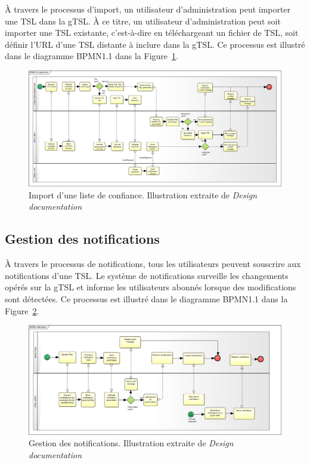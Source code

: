 \documentclass{tnreport}
\begin{document}
À travers le processus d'import, un utilisateur d'administration peut importer une TSL dans la gTSL. À ce titre, un utilisateur d'administration peut soit importer une TSL existante, c'est-à-dire en téléchargeant un fichier de TSL, soit définir l'URL d'une TSL distante à inclure dans la gTSL. Ce processus est illustré dans le diagramme BPMN1.1 dans la Figure~\ref{fig:import-flow}.

\begin{figure}[h]
	\centering
	\includegraphics[scale=0.31]{figures/import-flow}
	\caption{Import d'une liste de confiance. Illustration extraite de \textit{Design documentation}~\cite{design-document}}
	\label{fig:import-flow}
\end{figure}

\subsection{Gestion des notifications}

À travers le processus de notifications, tous les utilisateurs peuvent souscrire aux notifications d'une TSL. Le système de notifications surveille les changements opérés sur la gTSL et informe les utilisateurs abonnés lorsque des modifications sont détectées. Ce processus est illustré dans le diagramme BPMN1.1 dans la Figure~\ref{fig:notification-flow}.

\begin{figure}[h]
	\centering
	\includegraphics[scale=0.33]{figures/notification-flow}
	\caption{Gestion des notifications. Illustration extraite de \textit{Design documentation}~\cite{design-document}}
	\label{fig:notification-flow}
\end{figure}
\end{document}
